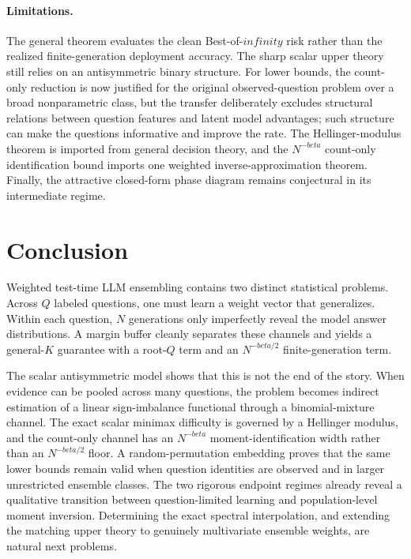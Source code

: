 \documentclass[11pt]{article}
\def\beta{beta}%
\def\infty{infinity}%
\newcommand\ced[1]{{\color{teal!70!black} #1}}
\begin{document}
\paragraph{Limitations.}
The general theorem evaluates the clean Best-of-$\infty$ risk rather than the realized finite-generation deployment accuracy.  The sharp scalar upper theory still relies on an antisymmetric binary structure.  For lower bounds, the count-only reduction is now justified for the original observed-question problem over a broad nonparametric class, but the transfer deliberately excludes structural relations between question features and latent model advantages; such structure can make the questions informative and improve the rate.  The Hellinger-modulus theorem is imported from general decision theory, and the $N^{-\beta}$ count-only identification bound imports one weighted inverse-approximation theorem.  Finally, the attractive closed-form phase diagram remains conjectural in its intermediate regime.

\section{Conclusion}

Weighted test-time LLM ensembling contains two distinct statistical problems.  Across $Q$ labeled questions, one must learn a weight vector that generalizes.  Within each question, $N$ generations only imperfectly reveal the model answer distributions.  A margin buffer cleanly separates these channels and yields a general-$K$ guarantee with a root-$Q$ term and an $N^{-\beta/2}$ finite-generation term.

The scalar antisymmetric model shows that this is not the end of the story.  When evidence can be pooled across many questions, the problem becomes indirect estimation of \ced{a linear sign-imbalance functional} through a binomial-mixture channel.  The exact scalar minimax difficulty is governed by a Hellinger modulus, and the count-only channel has an $N^{-\beta}$ moment-identification width rather than an $N^{-\beta/2}$ floor.  A random-permutation embedding proves that the same lower bounds remain valid when question identities are observed and in larger unrestricted ensemble classes.  The two rigorous endpoint regimes already reveal a qualitative transition between question-limited learning and population-level moment inversion.  Determining the exact spectral interpolation, and extending the matching upper theory to genuinely multivariate ensemble weights, are natural next problems.
\end{document}
